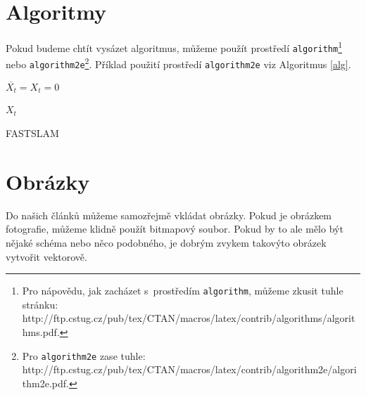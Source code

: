 \documentclass[11pt]{article}
\begin{document}
	\newpage
	
%
%

\section{Algoritmy}	
\label{sec:alg}

Pokud budeme chtít vysázet algoritmus, můžeme použít prostředí \texttt{algorithm}\footnote{Pro nápovědu, jak zacházet s~prostředím \texttt{algorithm}, můžeme zkusit tuhle stránku: \\ http://ftp.cstug.cz/pub/tex/CTAN/macros/latex/contrib/algorithms/algorithms.pdf.} nebo \texttt{algorithm2e}\footnote{Pro \texttt{algorithm2e} zase tuhle: http://ftp.cstug.cz/pub/tex/CTAN/macros/latex/contrib/algorithm2e/algorithm2e.pdf.}. Příklad použití prostředí \texttt{algorithm2e} viz Algoritmus \ref{alg}.

\IncMargin{1em}
\begin{algorithm}[H]
 \SetAlgoNoLine
 \PrintSemicolon
 \SetNlSty{}{}{:}
 \Indm
 \BlankLine
 \Indp
 $\overline{X_t} = X_t = 0$\\
 
 \Return $X_t$\
 \caption{{\small FAST}SLAM}
 \label{alg}
\end{algorithm}

%
%

\section{Obrázky}	

Do našich článků můžeme samozřejmě vkládat obrázky. Pokud je obrázkem fotografie, můžeme klidně použít bitmapový soubor. Pokud by to ale mělo být nějaké schéma nebo něco podobného, je dobrým zvykem takovýto obrázek vytvořit vektorově.
\end{document}
